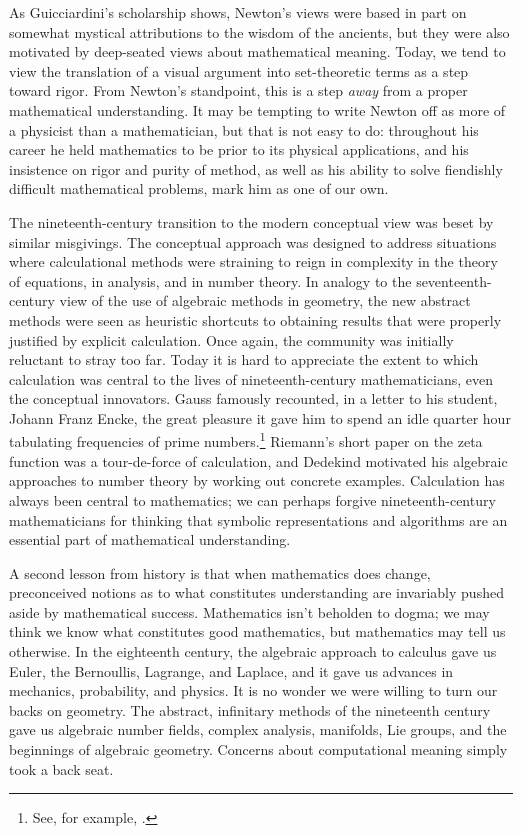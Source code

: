 \documentclass{amsart}
\theoremstyle{definition}
\theoremstyle{remark}
\numberwithin{equation}{section}
\begin{document}
As Guicciardini's scholarship shows, Newton's views were based in part on somewhat mystical attributions to the wisdom of the ancients, but they were also motivated by deep-seated views about mathematical meaning. Today, we tend to view the translation of a visual argument into set-theoretic terms as a step toward rigor. From Newton's standpoint, this is a step \emph{away} from a proper mathematical understanding. It may be tempting to write Newton off as more of a physicist than a mathematician, but that is not easy to do: throughout his career he held mathematics to be prior to its physical applications, and his insistence on rigor and purity of method, as well as his ability to solve fiendishly difficult mathematical problems, mark him as one of our own.

The nineteenth-century transition to the modern conceptual view was beset by similar misgivings. The conceptual approach was designed to address situations where calculational methods were straining to reign in complexity in the theory of equations, in analysis, and in number theory. In analogy to the seventeenth-century view of the use of algebraic methods in geometry, the new abstract methods were seen as heuristic shortcuts to obtaining results that were properly justified by explicit calculation. Once again, the community was initially reluctant to stray too far. Today it is hard to appreciate the extent to which calculation was central to the lives of nineteenth-century mathematicians, even the conceptual innovators. Gauss famously recounted, in a letter to his student, Johann Franz Encke, the great pleasure it gave him to spend an idle quarter hour tabulating frequencies of prime numbers.\footnote{See, for example, \cite{tschinkel:06}.} Riemann's short paper on the zeta function was a tour-de-force of calculation, and Dedekind motivated his algebraic approaches to number theory by working out concrete examples. Calculation has always been central to mathematics; we can perhaps forgive nineteenth-century mathematicians for thinking that symbolic representations and algorithms are an essential part of mathematical understanding.

A second lesson from history is that when mathematics does change, preconceived notions as to what constitutes understanding are invariably pushed aside by mathematical success. Mathematics isn't beholden to dogma; we may think we know what constitutes good mathematics, but mathematics may tell us otherwise. In the eighteenth century, the algebraic approach to calculus gave us Euler, the Bernoullis, Lagrange, and Laplace, and it gave us advances in mechanics, probability, and physics. It is no wonder we were willing to turn our backs on geometry. The abstract, infinitary methods of the nineteenth century gave us algebraic number fields, complex analysis, manifolds, Lie groups, and the beginnings of algebraic geometry. Concerns about computational meaning simply took a back seat.
\end{document}
